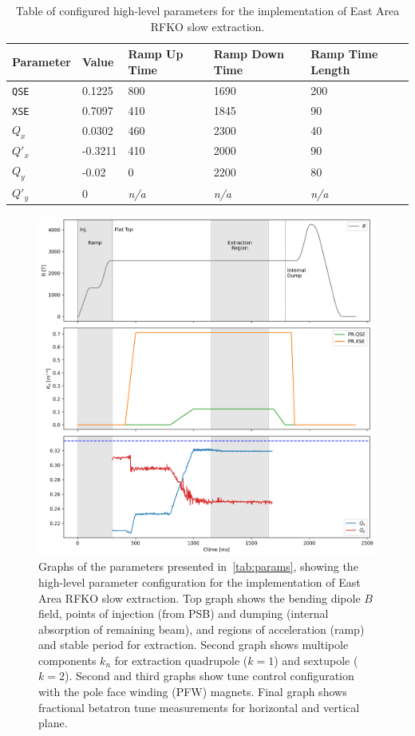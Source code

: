 \documentclass[11pt]{report}
\begin{document}
\begin{center}
  \centering
  \begin{table}[]
    \centering
    \begin{tabular}{lllll}
    Parameter & Value   & Ramp Up Time & Ramp Down Time & Ramp Time Length \\ \hline\hline
    \verb|QSE|& 0.1225  & 800          & 1690           & 200              \\
    \verb|XSE|& 0.7097  & 410          & 1845           & 90               \\
    $Q_x$     & 0.0302  & 460          & 2300           & 40               \\
    $Q'_x$    & -0.3211 & 410          & 2000           & 90               \\
    $Q_y$     & -0.02   & 0            & 2200           & 80               \\
    $Q'_y$    & 0       & \textit{n/a} & \textit{n/a}   & \textit{n/a}     \\
    \end{tabular}
    \caption{Table of configured high-level parameters for the implementation of East Area RFKO slow extraction.}\label{tab:params}
    \end{table}
\end{center}

\begin{figure}
  \centering
  \includegraphics[width=0.6\linewidth]{cyclegraphs.png}
  \caption{Graphs of the parameters presented in~\autoref{tab:params}, showing the high-level parameter configuration for the implementation of East Area RFKO slow extraction. Top graph shows the bending dipole $B$ field, points of injection (from PSB) and dumping (internal absorption of remaining beam), and regions of acceleration (ramp) and stable period for extraction. Second graph shows multipole components $k_n$ for extraction quadrupole ($k=1$) and sextupole ($k=2$). Second and third graphs show tune control configuration with the pole face winding (PFW) magnets. Final graph shows fractional betatron tune measurements for horizontal and vertical plane.}\label{fig:cycle}
\end{figure}
\end{document}
